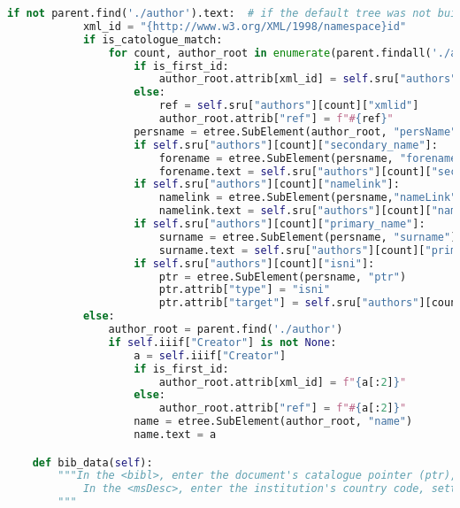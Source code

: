 \documentclass[class=article, crop=false]{standalone}
\begin{document}
\begin{lstlisting}[language=python, style=python]
        if not parent.find('./author').text:  # if the default tree was not built for 0 authors and doesn't have default text
            xml_id = "{http://www.w3.org/XML/1998/namespace}id"
            if is_catologue_match:
                for count, author_root in enumerate(parent.findall('./author')):
                    if is_first_id:
                        author_root.attrib[xml_id] = self.sru["authors"][count]["xmlid"]
                    else:
                        ref = self.sru["authors"][count]["xmlid"]
                        author_root.attrib["ref"] = f"#{ref}"
                    persname = etree.SubElement(author_root, "persName")
                    if self.sru["authors"][count]["secondary_name"]:
                        forename = etree.SubElement(persname, "forename")
                        forename.text = self.sru["authors"][count]["secondary_name"]
                    if self.sru["authors"][count]["namelink"]:
                        namelink = etree.SubElement(persname,"nameLink")
                        namelink.text = self.sru["authors"][count]["namelink"]
                    if self.sru["authors"][count]["primary_name"]:
                        surname = etree.SubElement(persname, "surname")
                        surname.text = self.sru["authors"][count]["primary_name"]
                    if self.sru["authors"][count]["isni"]:
                        ptr = etree.SubElement(persname, "ptr")
                        ptr.attrib["type"] = "isni"
                        ptr.attrib["target"] = self.sru["authors"][count]["isni"]
            else:
                author_root = parent.find('./author')
                if self.iiif["Creator"] is not None:
                    a = self.iiif["Creator"]
                    if is_first_id:
                        author_root.attrib[xml_id] = f"{a[:2]}"
                    else:
                        author_root.attrib["ref"] = f"#{a[:2]}"
                    name = etree.SubElement(author_root, "name")
                    name.text = a

    def bib_data(self):
        """In the <bibl>, enter the document's catalogue pointer (ptr), author, title, publication place, publisher, date.
            In the <msDesc>, enter the institution's country code, settlement, repository name, shelfmark for the doc, and doc type.
        """


\end{lstlisting}
\end{document}
